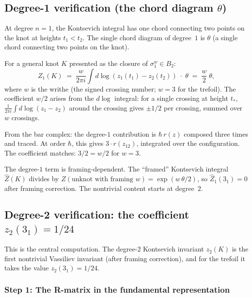 \documentclass[11pt]{article}
\begin{document}
\subsection{Degree-1 verification (the chord diagram $\theta$)}

At degree $n = 1$, the Kontsevich integral has one chord
connecting two points on the knot at heights $t_1 < t_2$.
The single chord diagram of degree~$1$ is $\theta$ (a single
chord connecting two points on the knot).

For a general knot $K$ presented as the closure of
$\sigma_1^{w} \in B_2$:
\begin{equation}\label{eq:degree-1-general}
  Z_1(K) \;=\;
  \frac{w}{2\pi i}
  \int
  d\log(z_1(t_1) - z_2(t_2))\;\cdot\;\theta
  \;=\;
  \frac{w}{2}\;\theta,
\end{equation}
where $w$ is the writhe (the signed crossing number;
$w = 3$ for the trefoil).  The coefficient $w/2$ arises from
the $d\log$ integral: for a single crossing at height $t_*$,
$\frac{1}{2\pi i}\int d\log(z_1 - z_2)$ around the
crossing gives $\pm 1/2$ per crossing, summed over $w$ crossings.

From the bar complex: the degree-$1$ contribution is
$\hbar\, r(z)$ composed three times and traced.  At order
$\hbar$, this gives $3 \cdot r(z_{12})$, integrated over
the configuration.  The coefficient matches: $3/2 = w/2$ for
$w = 3$.

\begin{remark}
The degree-$1$ term is framing-dependent.  The ``framed''
Kontsevich integral $\hat{Z}(K)$ divides by
$Z(\text{unknot with framing } w) = \exp(w\,\theta/2)$,
so $\hat{Z}_1(3_1) = 0$ after framing correction.  The
nontrivial content starts at degree~$2$.
\end{remark}

\subsection{Degree-2 verification: the coefficient $z_2(3_1) = 1/24$}
\label{subsec:degree-2-trefoil}

This is the central computation.  The degree-$2$ Kontsevich
invariant $z_2(K)$ is the first nontrivial Vassiliev invariant
(after framing correction), and for the trefoil it takes the
value $z_2(3_1) = 1/24$.

\subsubsection{Step 1: The R-matrix in the fundamental
representation}
\end{document}
